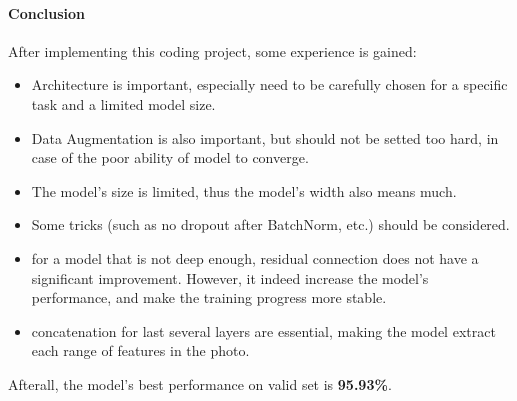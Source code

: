 \documentclass[a4 paper,12pt]{article}
\theoremstyle{definitionstyle}
\begin{document}
\paragraph{Conclusion}
After implementing this coding project, some experience is gained:
\begin{itemize}
    \item Architecture is important, especially need to be carefully chosen for a specific task and a limited model size.
    \item Data Augmentation is also important, but should not be setted too hard, in case of the poor ability of model to converge.
    \item The model's size is limited, thus the model's width also means much.
    \item Some tricks (such as no dropout after BatchNorm, etc.) should be considered.
    \item for a model that is not deep enough, residual connection does not have a significant improvement. However, it indeed increase the model's performance, and make the training progress more stable.
    \item concatenation for last several layers are essential, making the model extract each range of features in the photo.
\end{itemize}
Afterall, the model's best performance on valid set is \textbf{95.93\%}.
\end{document}
